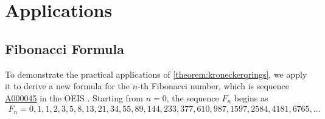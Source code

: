 \documentclass[11pt,reqno]{article}
\theoremstyle{plain}
\theoremstyle{definition}
\newcommand{\seqnum}[1]{\href{https://oeis.org/#1}{\rm \underline{#1}}}
\begin{document}
\section{Applications} \label{section:applications}

\subsection{Fibonacci Formula}
To demonstrate the practical applications of \cref{theorem:kroneckerqrings}, we apply it to derive a new formula for the $n$-th Fibonacci number, which is sequence \seqnum{A000045} in the OEIS \cite{A000045}.  Starting from $n=0$, the sequence $F_n$ begins as
\begin{align*}
    F_n = 0, 1, 1, 2, 3, 5, 8, 13, 21, 34, 55, 89, 144, 233, 377, 610, 987, 1597, 2584, 4181, 6765, \ldots
\end{align*}
\end{document}
